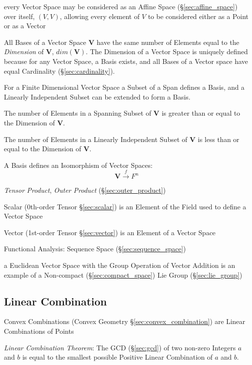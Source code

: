 every Vector Space may be considered as an Affine Space
(\S\ref{sec:affine_space}) over itself, $(V,V)$, allowing every element of $V$
to be considered either as a Point or as a Vector

All Bases of a Vector Space $\mathbf{V}$ have the same number of
Elements equal to the \emph{Dimension} of $\mathbf{V}$,
$dim(\mathbf{V})$. The Dimension of a Vector Space is uniquely defined
because for any Vector Space, a Basis exists, and all Bases of a
Vector space have equal Cardinality (\S\ref{sec:cardinality}).

For a Finite Dimensional Vector Space a Subset of a Span defines a
Basis, and a Linearly Independent Subset can be extended to form a
Basis.

The number of Elements in a Spanning Subset of $\mathbf{V}$ is greater
than or equal to the Dimension of $\mathbf{V}$.

The number of Elements in a Linearly Independent Subset of
$\mathbf{V}$ is less than or equal to the Dimension of $\mathbf{V}$.

A Basis defines an Isomorphism of Vector Spaces:
\[
    \mathbf{V} \xrightarrow{f} F^n
\]

\emph{Tensor Product}, \emph{Outer Product} (\S\ref{sec:outer_product})

Scalar (0th-order Tensor \S\ref{sec:scalar}) is an Element of the
Field used to define a Vector Space

Vector (1st-order Tensor \S\ref{sec:vector}) is an Element of a Vector
Space

Functional Analysis: Sequence Space (\S\ref{sec:sequence_space})

a Euclidean Vector Space with the Group Operation of Vector Addition is an
example of a Non-compact (\S\ref{sec:compact_space}) Lie Group
(\S\ref{sec:lie_group})



\subsection{Linear Combination}\label{sec:linear_combination}

\fist Convex Combinations (Convex Geometry \S\ref{sec:convex_combination}) are
Linear Combinations of Points

\emph{Linear Combination Theorem}: The GCD (\S\ref{sec:gcd}) of two non-zero
Integers $a$ and $b$ is equal to the smallest possible Positive Linear
Combination of $a$ and $b$.



